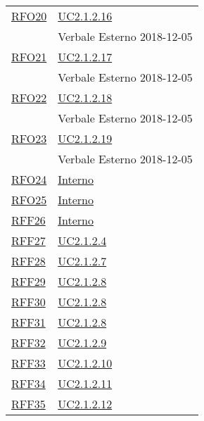 \begin{longtable}{|>{\centering}m{5cm}|m{5cm}<{\centering}|}
	\hyperlink{RFO20}{RFO20} & \hyperref[UC2.1.2.16]{UC2.1.2.16}\\& Verbale Esterno 2018-12-05\\ \hline
	
	\hyperlink{RFO21}{RFO21} & \hyperref[UC2.1.2.17]{UC2.1.2.17}\\& Verbale Esterno 2018-12-05\\ \hline
	
	\hyperlink{RFO22}{RFO22} & \hyperref[UC2.1.2.18]{UC2.1.2.18}\\& Verbale Esterno 2018-12-05\\ \hline
	
	\hyperlink{RFO23}{RFO23} & \hyperref[UC2.1.2.19]{UC2.1.2.19}\\& Verbale Esterno 2018-12-05\\ \hline
	
	\hyperlink{RFO24}{RFO24} & \hyperref[Interno]{Interno}\\ \hline
	
	\hyperlink{RFO25}{RFO25} & \hyperref[Interno]{Interno}\\ \hline
	
	\hyperlink{RFF26}{RFF26} & \hyperref[Interno]{Interno}\\ \hline
	
	\hyperlink{RFF27}{RFF27} & \hyperref[UC2.1.2.4]{UC2.1.2.4}\\ \hline
	
	\hyperlink{RFF28}{RFF28} & \hyperref[UC2.1.2.7]{UC2.1.2.7}\\ \hline
	
	\hyperlink{RFF29}{RFF29} & \hyperref[UC2.1.2.8]{UC2.1.2.8}\\ \hline
	
	\hyperlink{RFF30}{RFF30} & \hyperref[UC2.1.2.8]{UC2.1.2.8}\\ \hline
	
	\hyperlink{RFF31}{RFF31} & \hyperref[UC2.1.2.8]{UC2.1.2.8}\\ \hline
	
	\hyperlink{RFF32}{RFF32} & \hyperref[UC2.1.2.9]{UC2.1.2.9}\\ \hline
	
	\hyperlink{RFF33}{RFF33} & \hyperref[UC2.1.2.10]{UC2.1.2.10}\\ \hline
	
	\hyperlink{RFF34}{RFF34} & \hyperref[UC2.1.2.11]{UC2.1.2.11}\\ \hline
	
	\hyperlink{RFF35}{RFF35} & \hyperref[UC2.1.2.12]{UC2.1.2.12}\\ \hline
	

\end{longtable}
